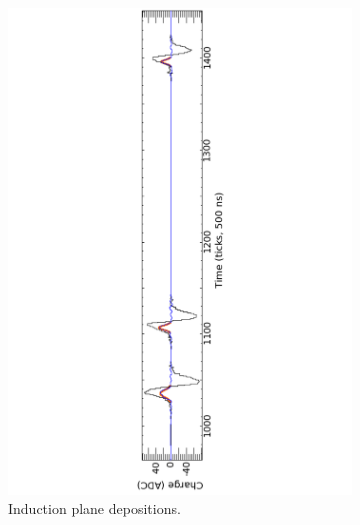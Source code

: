 \begin{figure}[h!]
\begin{subfigure}{0.95\textwidth}
    \includegraphics[width=\textwidth]{InductionPlane}
    \caption{Induction plane depositions.}
    \label{fig:LotsOfHits_Ind}
  \end{subfigure}
  \begin{subfigure}{0.95\textwidth}
    \centering

\end{subfigure}
\end{figure}
